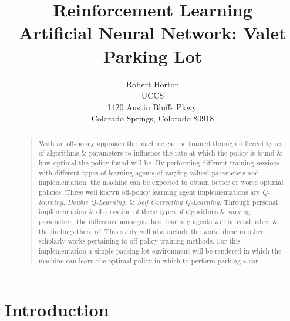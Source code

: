 \documentclass[letterpaper]{article}
\begin{document}
%
\title{Reinforcement Learning\\ Artificial Neural Network: Valet Parking Lot }
\author{Robert Horton\\
UCCS\\
1420 Austin Bluffs Pkwy,\\
Colorado Springs, Colorado 80918\\
}
\maketitle

\begin{abstract}
\begin{quote}
With an off-policy approach the machine can be trained through different types of algorithms \& parameters to influence the rate at which the policy is found \& how optimal the policy found will be. By performing different training sessions with different types of learning agents of varying valued parameters and implementation, the machine can be expected to obtain better or worse optimal policies. Three well known off-policy learning agent implementations are \emph{Q-learning}, \emph{Double Q-Learning}, \& \emph{Self Correcting Q-Learning}. Through personal implementation \& observation of these types of algorithms \& varying parameters, the difference amongst these learning agents will be established \& the findings there of.  This study will also include the works done in other scholarly works pertaining to off-policy training methods.  For this implementation a simple parking lot environment will be rendered in which the machine can learn the optimal policy in which to perform parking a car. 
\end{quote}
\end{abstract}

\section{Introduction}
\end{document}
